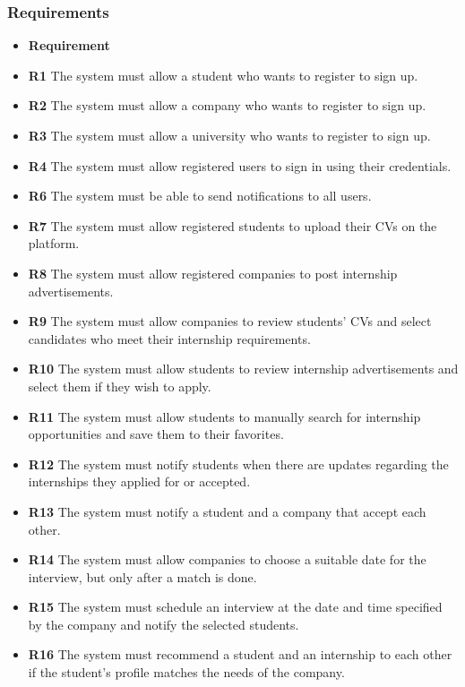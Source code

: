 \documentclass{article}
\begin{document}
\subsubsection{Requirements}
    \begin{itemize}
        \item \textbf{Requirement} 
        \item \textbf{R1} The system must allow a student who wants to register to sign up.
        \item \textbf{R2} The system must allow a company who wants to register to sign up.
        \item \textbf{R3} The system must allow a university who wants to register to sign up.
        \item \textbf{R4} The system must allow registered users to sign in using their credentials.
        \item \textbf{R6} The system must be able to send notifications to all users.
        \item \textbf{R7} The system must allow registered students to upload their CVs on the platform.
        \item \textbf{R8} The system must allow registered companies to post internship advertisements.
        \item \textbf{R9} The system must allow companies to review students' CVs and select candidates who meet their internship requirements.
        \item \textbf{R10} The system must allow students to review internship advertisements and select them if they wish to apply.
         \item \textbf{R11} The system must allow students to manually search for internship opportunities and save them to their favorites.
         \item \textbf{R12} The system must notify students when there are updates regarding the internships they applied for or accepted.
        \item \textbf{R13} The system must notify a student and a company that accept each other.
        \item \textbf{R14} The system must allow companies to choose a suitable date for the interview, but only after a match is done.
        \item \textbf{R15} The system must schedule an interview at the date and time specified by the company and notify the selected students.
        \item \textbf{R16} The system must recommend a student and an internship to each other if the student's profile matches the needs of the company. 

\end{itemize}
\end{document}
